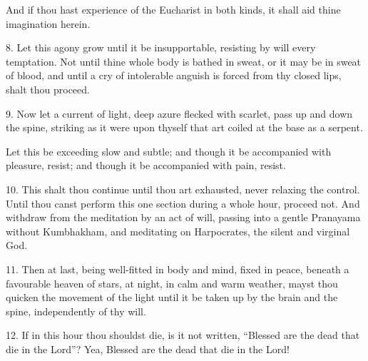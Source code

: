 And if thou hast experience of the Eucharist in both kinds, it shall aid thine imagination herein.

8. Let this agony grow until it be insupportable, resisting by will every temptation. Not until thine whole body is bathed in sweat, or it may be in sweat of blood, and until a cry of intolerable anguish is forced from thy closed lips, shalt thou proceed.

9. Now let a current of light, deep azure flecked with scarlet, pass up and down the spine, striking as it were upon thyself that art coiled at the base as a serpent.

Let this be exceeding slow and subtle; and though it be accompanied with pleasure, resist; and though it be accompanied with pain, resist.

10. This shalt thou continue until thou art exhausted, never relaxing the control. Until thou canst perform this one section during a whole hour, proceed not. And withdraw from the meditation by an act of will, passing into a gentle Pranayama without Kumbhakham, and meditating on Harpocrates, the silent and virginal God.

11. Then at last, being well-fitted in body and mind, fixed in peace, beneath a favourable heaven of stars, at night, in calm and warm weather, mayst thou quicken the movement of the light until it be taken up by the brain and the spine, independently of thy will.

12. If in this hour thou shouldst die, is it not written, \enquote{Blessed are the dead that die in the Lord}? Yea, Blessed are the dead that die in the Lord!

